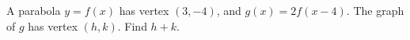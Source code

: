 A parabola $y=f(x)$ has vertex $(3,-4)$, and $g(x)=2f(x-4)$. The graph of $g$ has vertex $(h,k)$. Find $h+k$.
